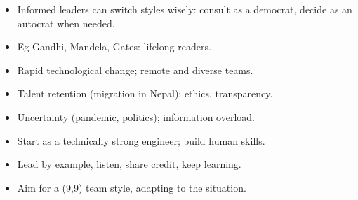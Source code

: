 {\begin{itemize}
\begin{itemize}
    \item \textbf{Communication}: vocabulary, clear expression.
  \end{itemize}
  \item Informed leaders can switch styles wisely: consult as a democrat, decide as an
    autocrat when needed.
  \item Eg Gandhi, Mandela, Gates: lifelong readers.
\end{itemize}
\begin{itemize}
  \item Rapid technological change; remote and diverse teams.
  \item Talent retention (migration in Nepal); ethics, transparency.
  \item Uncertainty (pandemic, politics); information overload.
\end{itemize}
\begin{itemize}
  \item Start as a technically strong engineer; build human skills.
  \item Lead by example, listen, share credit, keep learning.
  \item Aim for a (9,9) team style, adapting to the situation.
\end{itemize}}


